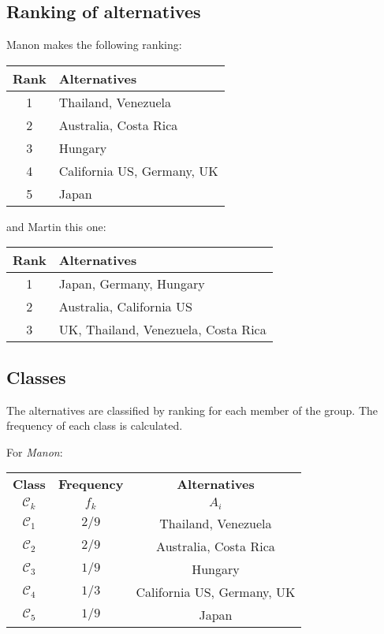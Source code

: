 \documentclass[12pt,a4paper]{article}
\begin{document}
\subsection{Ranking of alternatives}
Manon makes the following ranking:

\begin{tabular}{|c|l|}
\hline
\textbf{Rank}&\textbf{Alternatives}\\
\hline
1 & Thailand, Venezuela \\
2 & Australia, Costa Rica \\
3 & Hungary \\
4 & California US, Germany, UK \\
5 & Japan \\
\hline
\end{tabular}

and Martin this one:

\begin{tabular}{|c|l|}
\hline
\textbf{Rank}&\textbf{Alternatives}\\
\hline
1 & Japan, Germany, Hungary \\
2 & Australia, California US \\
3 & UK, Thailand, Venezuela, Costa Rica \\
\hline
\end{tabular}

\subsection{Classes}

The alternatives are classified by ranking for each member of the group. The frequency of each class is calculated.

For \textsl{Manon}:

\begin{tabular}{|c|c|c|}
\hline
\textbf{Class}&\textbf{Frequency} &\textbf{Alternatives}\\
$\mathcal{C}_k$ & $f_k$ & $A_i$ \\
\hline
$\mathcal{C}_1$ & $2/9$ & Thailand, Venezuela \\
$\mathcal{C}_2$ & $2/9$ & Australia, Costa Rica \\
$\mathcal{C}_3$ & $1/9$ & Hungary \\
$\mathcal{C}_4$ & $1/3$ & California US, Germany, UK \\
$\mathcal{C}_5$ & $1/9$ & Japan \\
\hline
\end{tabular}
\end{document}
